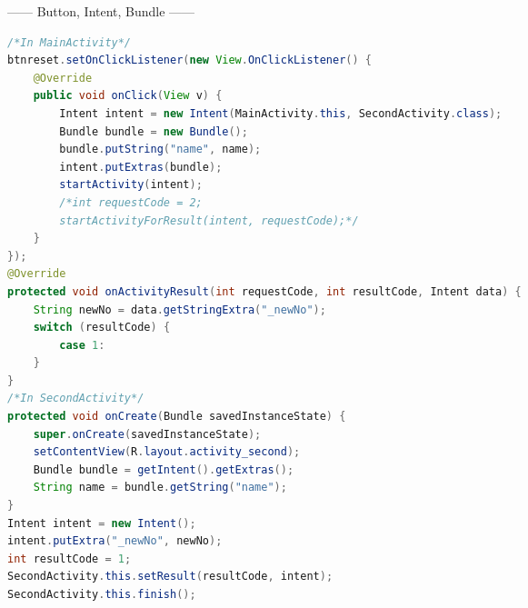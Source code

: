 \documentclass[10pt,a4paper,twocolumn]{report}
\begin{document}
\begin{CJK}{UTF8}{Courier New}

\linespread{0.7}

\fontsize{6pt}{0pt}
\selectfont

------ Button, Intent, Bundle ------
\begin{lstlisting}[language=Java]
/*In MainActivity*/
btnreset.setOnClickListener(new View.OnClickListener() {
	@Override
	public void onClick(View v) {
		Intent intent = new Intent(MainActivity.this, SecondActivity.class);
		Bundle bundle = new Bundle();
		bundle.putString("name", name);
		intent.putExtras(bundle);
		startActivity(intent);
		/*int requestCode = 2;
		startActivityForResult(intent, requestCode);*/
	}
});
@Override
protected void onActivityResult(int requestCode, int resultCode, Intent data) {
	String newNo = data.getStringExtra("_newNo");
	switch (resultCode) {
		case 1:
	}
}
/*In SecondActivity*/
protected void onCreate(Bundle savedInstanceState) {
	super.onCreate(savedInstanceState);
	setContentView(R.layout.activity_second);
	Bundle bundle = getIntent().getExtras();
	String name = bundle.getString("name");
}
Intent intent = new Intent();
intent.putExtra("_newNo", newNo);
int resultCode = 1;
SecondActivity.this.setResult(resultCode, intent);
SecondActivity.this.finish();
\end{lstlisting}


\end{CJK}
\end{document}
